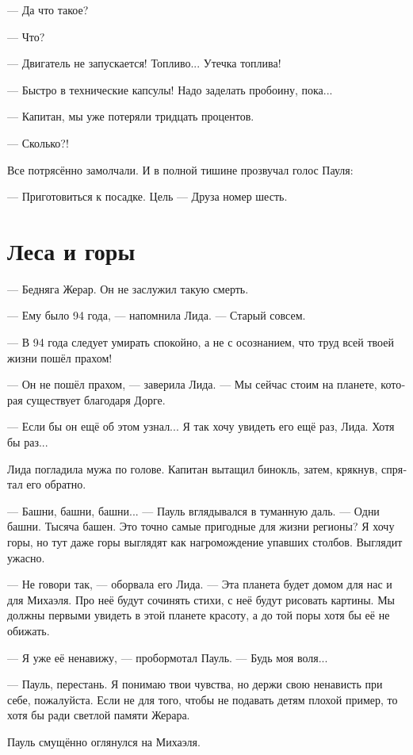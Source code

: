 \documentclass[a4paper,12pt,fleqn]{book}\usepackage{cooltooltips}\usepackage{polyglossia}\setdefaultlanguage[babelshorthands=true]{russian}\setotherlanguage{english}\defaultfontfeatures{Ligatures=TeX,Mapping=tex-text} \usepackage{xcolor}\definecolor{lightgray}{HTML}{bbbbbb}\color{lightgray}\newcommand{\ml}[3]{\textenglish{\textcolor{black}{#3}}}
\begin{document}
--- Да что такое?

--- Что?

--- Двигатель не запускается!
Топливо...
Утечка топлива!

--- Быстро в технические капсулы!
Надо заделать пробоину, пока...

--- Капитан, мы уже потеряли тридцать процентов.

--- Сколько?!

Все потрясённо замолчали.
И в полной тишине прозвучал голос Пауля:

--- Приготовиться к посадке.
Цель --- Друза номер шесть.

\section{Леса и горы}

--- Бедняга Жерар.
Он не заслужил такую смерть.

--- Ему было 94 года, --- напомнила Лида.
--- Старый совсем.

--- В 94 года следует умирать спокойно, а не с осознанием, что труд всей твоей жизни пошёл прахом!

--- Он не пошёл прахом, --- заверила Лида.
--- Мы сейчас стоим на планете, которая существует благодаря Дорге.

--- Если бы он ещё об этом узнал...
Я так хочу увидеть его ещё раз, Лида.
Хотя бы раз...

Лида погладила мужа по голове.
Капитан вытащил бинокль, затем, крякнув, спрятал его обратно.

--- Башни, башни, башни... --- Пауль вглядывался в туманную даль.
--- Одни башни.
Тысяча башен.
Это точно самые пригодные для жизни регионы?
Я хочу горы, но тут даже горы выглядят как нагромождение упавших столбов.
Выглядит ужасно.

--- Не говори так, --- оборвала его Лида.
--- Эта планета будет домом для нас и для Михаэля.
Про неё будут сочинять стихи, с неё будут рисовать картины.
Мы должны первыми увидеть в этой планете красоту, а до той поры хотя бы её не обижать.

--- Я уже её ненавижу, --- пробормотал Пауль.
--- Будь моя воля...

--- Пауль, перестань.
Я понимаю твои чувства, но держи свою ненависть при себе, пожалуйста.
Если не для того, чтобы не подавать детям плохой пример, то хотя бы ради светлой памяти Жерара.

Пауль смущённо оглянулся на Михаэля.
\end{document}
